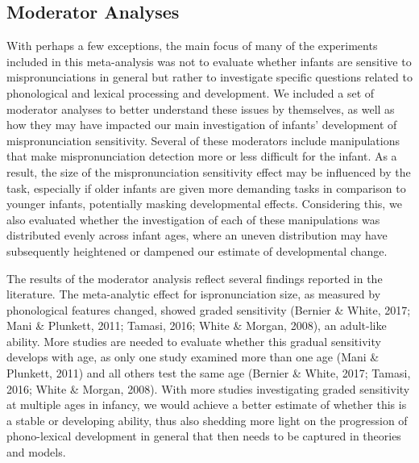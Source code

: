 \documentclass[
  man, noextraspace]{apa6}
\begin{document}
\hypertarget{moderator-analyses-1}{%
\subsection{Moderator Analyses}\label{moderator-analyses-1}}

With perhaps a few exceptions, the main focus of many of the experiments included in this meta-analysis was not to evaluate whether infants are sensitive to mispronunciations in general but rather to investigate specific questions related to phonological and lexical processing and development. We included a set of moderator analyses to better understand these issues by themselves, as well as how they may have impacted our main investigation of infants' development of mispronunciation sensitivity. Several of these moderators include manipulations that make mispronunciation detection more or less difficult for the infant. As a result, the size of the mispronunciation sensitivity effect may be influenced by the task, especially if older infants are given more demanding tasks in comparison to younger infants, potentially masking developmental effects. Considering this, we also evaluated whether the investigation of each of these manipulations was distributed evenly across infant ages, where an uneven distribution may have subsequently heightened or dampened our estimate of developmental change.

The results of the moderator analysis reflect several findings reported in the literature. The meta-analytic effect for ispronunciation size, as measured by phonological features changed, showed graded sensitivity (Bernier \& White, 2017; Mani \& Plunkett, 2011; Tamasi, 2016; White \& Morgan, 2008), an adult-like ability. More studies are needed to evaluate whether this gradual sensitivity develops with age, as only one study examined more than one age (Mani \& Plunkett, 2011) and all others test the same age (Bernier \& White, 2017; Tamasi, 2016; White \& Morgan, 2008). With more studies investigating graded sensitivity at multiple ages in infancy, we would achieve a better estimate of whether this is a stable or developing ability, thus also shedding more light on the progression of phono-lexical development in general that then needs to be captured in theories and models.
\end{document}
